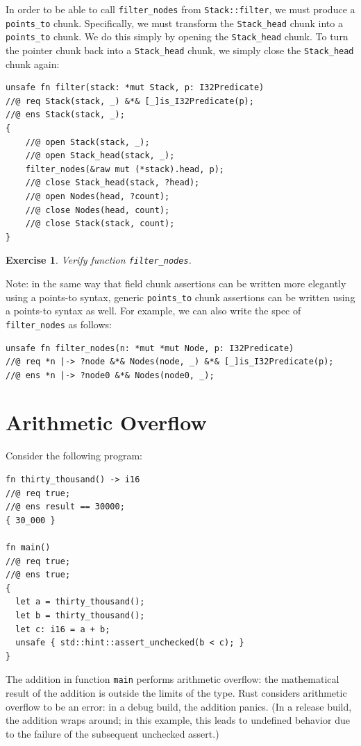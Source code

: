 \documentclass{article}
\newtheorem{exercise}{Exercise}
\begin{document}
In order to be able to call \lstinline!filter_nodes! from
\lstinline!Stack::filter!, we must produce a \lstinline!points_to!
chunk. Specifically, we must transform the
\lstinline!Stack_head! chunk into a \lstinline!points_to! chunk.
We do this simply by opening the \lstinline!Stack_head! chunk.
To turn the pointer chunk back into a \lstinline!Stack_head!
chunk, we simply close the \lstinline!Stack_head! chunk again:
\begin{lstlisting}
unsafe fn filter(stack: *mut Stack, p: I32Predicate)
//@ req Stack(stack, _) &*& [_]is_I32Predicate(p);
//@ ens Stack(stack, _);
{
    //@ open Stack(stack, _);
    //@ open Stack_head(stack, _);
    filter_nodes(&raw mut (*stack).head, p);
    //@ close Stack_head(stack, ?head);
    //@ open Nodes(head, ?count);
    //@ close Nodes(head, count);
    //@ close Stack(stack, count);
}
\end{lstlisting}

\begin{exercise}\label{exercise:byref}
Verify function \lstinline!filter_nodes!.
\end{exercise}

Note: in the same way that field chunk assertions can be written more elegantly using a points-to syntax, generic \lstinline|points_to| chunk assertions can be written using a points-to syntax as well. For example, we can also write the spec of \lstinline!filter_nodes! as follows:
\begin{lstlisting}
unsafe fn filter_nodes(n: *mut *mut Node, p: I32Predicate)
//@ req *n |-> ?node &*& Nodes(node, _) &*& [_]is_I32Predicate(p);
//@ ens *n |-> ?node0 &*& Nodes(node0, _);
\end{lstlisting}

\section{Arithmetic Overflow}

Consider the following program:
\begin{lstlisting}
fn thirty_thousand() -> i16
//@ req true;
//@ ens result == 30000;
{ 30_000 }

fn main()
//@ req true;
//@ ens true;
{
  let a = thirty_thousand();
  let b = thirty_thousand();
  let c: i16 = a + b;
  unsafe { std::hint::assert_unchecked(b < c); }
}
\end{lstlisting}
The addition in function \lstinline|main| performs arithmetic overflow: the mathematical result of the addition is outside the limits of the type. Rust considers arithmetic overflow to be an error: in a debug build, the addition panics. (In a release build, the addition wraps around; in this example, this leads to undefined behavior due to the failure of the subsequent unchecked assert.)
\end{document}
